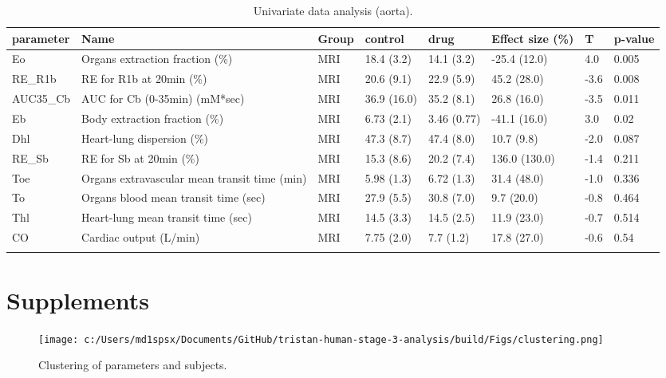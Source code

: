 \documentclass{epflreport}%
\begin{document}
\clearpage%
\begin{longtable}{|p{1.5cm}|p{1.5cm}|p{1.5cm}|p{1.5cm}|p{1.5cm}|p{1.5cm}|p{1.5cm}|p{1.5cm}|}%
\hline%
parameter&Name&Group&control&drug&Effect size (\%)&T&p{-}value\\%
\hline%
Eo&Organs extraction fraction (\%)&MRI&18.4 (3.2) &14.1 (3.2) &{-}25.4 (12.0) &4.0&0.005\\%
RE\_R1b&RE for R1b at 20min (\%)&MRI&20.6 (9.1) &22.9 (5.9) &45.2 (28.0) &{-}3.6&0.008\\%
AUC35\_Cb&AUC for Cb (0{-}35min) (mM*sec)&MRI&36.9 (16.0) &35.2 (8.1) &26.8 (16.0) &{-}3.5&0.011\\%
Eb&Body extraction fraction (\%)&MRI&6.73 (2.1) &3.46 (0.77) &{-}41.1 (16.0) &3.0&0.02\\%
Dhl&Heart{-}lung dispersion (\%)&MRI&47.3 (8.7) &47.4 (8.0) &10.7 (9.8) &{-}2.0&0.087\\%
RE\_Sb&RE for Sb at 20min (\%)&MRI&15.3 (8.6) &20.2 (7.4) &136.0 (130.0) &{-}1.4&0.211\\%
Toe&Organs extravascular mean transit time (min)&MRI&5.98 (1.3) &6.72 (1.3) &31.4 (48.0) &{-}1.0&0.336\\%
To&Organs blood mean transit time (sec)&MRI&27.9 (5.5) &30.8 (7.0) &9.7 (20.0) &{-}0.8&0.464\\%
Thl&Heart{-}lung mean transit time (sec)&MRI&14.5 (3.3) &14.5 (2.5) &11.9 (23.0) &{-}0.7&0.514\\%
CO&Cardiac output (L/min)&MRI&7.75 (2.0) &7.7 (1.2) &17.8 (27.0) &{-}0.6&0.54\\%
\hline%
\caption{Univariate data analysis (aorta).} \\%
\end{longtable}%
\clearpage%
\chapter{Supplements}%
\clearpage%


\begin{figure}[h!]%
\centering%
\texttt{[image: c:/Users/md1spsx/Documents/GitHub/tristan-human-stage-3-analysis/build/Figs/clustering.png]}%
\caption{Clustering of parameters and subjects.}%
\end{figure}

%
\end{document}
